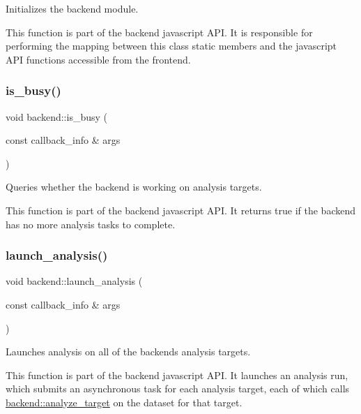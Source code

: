 Initializes the backend module. 

This function is part of the backend javascript A\+PI. It is responsible for performing the mapping between this class\textquotesingle{} static members and the javascript A\+PI functions accessible from the frontend. \mbox{\label{classbackend_aea5762a8de17d93aadb8d1a870e1474d}} 
\subsubsection{\texorpdfstring{is\+\_\+busy()}{is\_busy()}}
{\footnotesize\ttfamily void backend\+::is\+\_\+busy (\begin{DoxyParamCaption}\item[{const callback\+\_\+info \&}]{args }\end{DoxyParamCaption})\hspace{0.3cm}{\ttfamily [static]}}



Queries whether the backend is working on analysis targets. 

This function is part of the backend javascript A\+PI. It returns true if the backend has no more analysis tasks to complete. \mbox{\label{classbackend_adea4e670e5c1e84d295c5cd03deceb4a}} 
\subsubsection{\texorpdfstring{launch\+\_\+analysis()}{launch\_analysis()}}
{\footnotesize\ttfamily void backend\+::launch\+\_\+analysis (\begin{DoxyParamCaption}\item[{const callback\+\_\+info \&}]{args }\end{DoxyParamCaption})\hspace{0.3cm}{\ttfamily [static]}}



Launches analysis on all of the backend\textquotesingle{}s analysis targets. 

This function is part of the backend javascript A\+PI. It launches an analysis run, which submits an asynchronous task for each analysis target, each of which calls \hyperlink{classbackend_a23963a7c7e73bba71cbf77e27224efd8}{backend\+::analyze\+\_\+target} on the dataset for that target. \mbox{\label{classbackend_aa4a237c847f3bdc527b7bf01f2fa1974}} 
